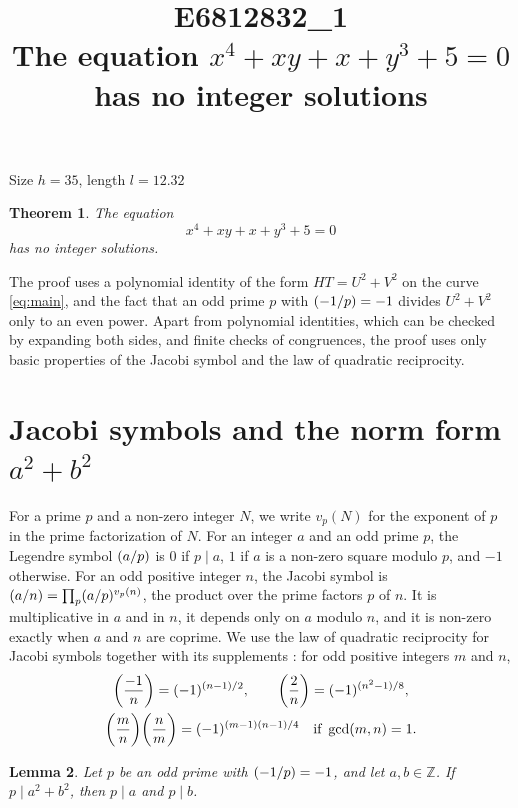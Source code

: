 \documentclass[11pt]{article}
\title{\textbf{E6812832\_1}\\[4pt] {\Large The equation $x^{4}+xy+x+y^{3}+5=0$ has no integer solutions}}
\author{}
\date{}
\newtheorem{theorem}{Theorem}
\newtheorem{lemma}[theorem]{Lemma}
\newcommand{\Z}{\mathbb{Z}}
\newcommand{\leg}[2]{\mathchoice{\biggl(\dfrac{#1}{#2}\biggr)}{(#1/#2)}{(#1/#2)}{(#1/#2)}}
\begin{document}
\maketitle
\vspace{-8ex}
\begin{center}
Size $h=35$, length $l=12.32$
\end{center}

\begin{theorem}\label{thm:main}
The equation
\begin{equation}\label{eq:main}
x^{4}+xy+x+y^{3}+5=0
\end{equation}
has no integer solutions.
\end{theorem}

The proof uses a polynomial identity of the form $HT=U^2+V^2$ on the curve \eqref{eq:main}, and the fact that an odd prime $p$ with $\leg{-1}{p}=-1$ divides $U^2+V^2$ only to an even power. Apart from polynomial identities, which can be checked by expanding both sides, and finite checks of congruences, the proof uses only basic properties of the Jacobi symbol and the law of quadratic reciprocity.

\section{\texorpdfstring{Jacobi symbols and the norm form $a^2+b^2$}{Jacobi symbols and the norm form}}

For a prime $p$ and a non-zero integer $N$, we write $v_p(N)$ for the exponent of $p$ in the prime factorization of $N$. For an integer $a$ and an odd prime $p$, the Legendre symbol $\leg{a}{p}$ is $0$ if $p\mid a$, $1$ if $a$ is a non-zero square modulo $p$, and $-1$ otherwise. For an odd positive integer $n$, the Jacobi symbol is $\leg{a}{n}=\prod_p\leg{a}{p}^{v_p(n)}$, the product over the prime factors $p$ of $n$. It is multiplicative in $a$ and in $n$, it depends only on $a$ modulo $n$, and it is non-zero exactly when $a$ and $n$ are coprime. We use the law of quadratic reciprocity for Jacobi symbols together with its supplements \cite[Chapter~5, \S2]{IR}: for odd positive integers $m$ and $n$,
\begin{gather*}
\leg{-1}{n}=(-1)^{(n-1)/2},\qquad\leg{2}{n}=(-1)^{(n^2-1)/8},\\
\leg{m}{n}\leg{n}{m}=(-1)^{(m-1)(n-1)/4}\quad\text{if }\gcd(m,n)=1.
\end{gather*}

\begin{lemma}\label{lem:divides}
Let $p$ be an odd prime with $\leg{-1}{p}=-1$, and let $a,b\in\Z$. If $p\mid a^2+b^2$, then $p\mid a$ and $p\mid b$.
\end{lemma}
\end{document}
